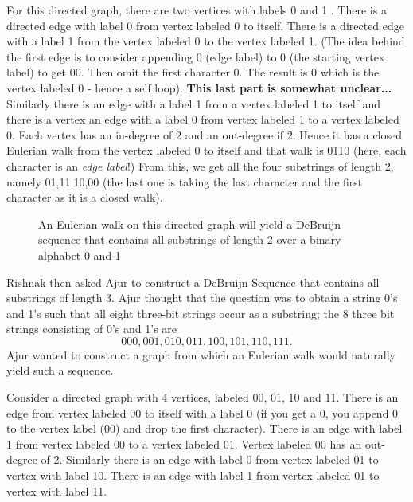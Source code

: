For this directed graph, there are two vertices with labels 0 and 1 . There is a directed edge with label 0 from vertex labeled 0 to itself. There is a directed edge with a label 1 from the vertex labeled 0 to the vertex labeled 1. (The idea behind the first edge is to consider appending 0 (edge label) to 0 (the starting vertex label) to get 00. Then omit the first character 0. The result is 0 which is the vertex labeled 0 - hence a self loop). \textbf{This last part is somewhat unclear...} Similarly there is an edge with a label 1 from a vertex labeled 1 to itself and there is a vertex an edge with 
a label 0 from vertex labeled 1 to a vertex labeled 0.
Each vertex has an in-degree of 2 and an out-degree if 2. Hence it has a closed Eulerian walk from the vertex labeled 0 to itself and that walk is 0110 (here, each character is an \emph{edge label}!) From this, we get all the four substrings of length 2, namely 01,11,10,00 (the last one is taking the last character and the first character as it is a closed walk).

\begin{figure}
\begin{center}
\caption{ An Eulerian walk on this directed graph will yield a DeBruijn sequence that contains  all substrings of length 2 over a binary alphabet 0 and 1}\label{4g55}
\end{center}
\end{figure}
Rishnak then asked Ajur to construct a DeBruijn Sequence that contains all substrings of length 3.
Ajur thought that the question was to obtain a string 0's and 1's such that all eight three-bit strings occur as a substring; the 8 three bit strings consisting of 0's and 1's are 
$$000, 001, 010, 011, 100, 101, 110, 111.$$ Ajur wanted to construct a graph from which an Eulerian walk would naturally yield such a sequence. 

Consider a directed graph with 4 vertices, labeled 00, 01, 10 and 11.
There is an edge from vertex labeled 00 to itself with a label 0 (if you get a 0, you append 0 to the vertex label (00) and drop the first character). There is an edge with label 1 from
vertex labeled 00 to a vertex labeled 01. Vertex labeled 00 has an out-degree of 2. Similarly there is an edge with label 0 from vertex labeled 01 to vertex with label 10. There is an edge with label 1 from vertex labeled 01 to vertex with label 11. 


